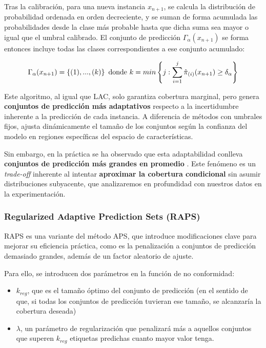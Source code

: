 Tras la calibración, para una nueva instancia $x_{n+1}$, se calcula la distribución de probabilidad ordenada
en orden decreciente, y se suman de forma acumulada las probabilidades desde la clase más probable hasta 
que dicha suma sea mayor o igual que el umbral calibrado. El conjunto de predicción $\Gamma_\alpha(x_{n+1})$
se forma entonces incluye todas las clases correspondientes a ese conjunto acumulado: 

$$
\Gamma_\alpha(x_{n+1}) = \left\{ (1),...,(k) \right\} \\ \textnormal{ donde } 
k = min\left\{ j: \sum_{i=1}^{j} \hat{\pi}_{(i)}(x_{n+1}) \ge \delta_\alpha \right\} 
$$

Este algoritmo, al igual que LAC, solo garantiza cobertura marginal, pero genera \textbf{conjuntos de 
predicción más adaptativos} respecto a la incertidumbre inherente a la predicción de cada instancia. 
A diferencia de métodos con umbrales fijos, ajusta dinámicamente el tamaño de los conjuntos según la 
confianza del modelo en regiones específicas del espacio de características.

Sin embargo, en la práctica se ha observado que esta adaptabilidad conlleva \textbf{conjuntos de predicción 
más grandes en promedio} \cite{romano2020, angelopoulos2020}. 
Este fenómeno es un \textit{trade-off} inherente al intentar \textbf{aproximar la cobertura condicional} sin 
asumir distribuciones subyacente, que analizaremos en profundidad con nuestros datos en la experimentación. 


\subsubsection{Regularized Adaptive Prediction Sets (RAPS)}

RAPS \cite{angelopoulos2020} es una variante del método APS, que introduce modificaciones clave para mejorar
su eficiencia práctica, como es la penalización a conjuntos de predicción demasiado grandes, además de un
factor aleatorio de ajuste. 

Para ello, se introducen dos parámetros en la función de no conformidad:

\begin{itemize}
    \item $k_{reg}$, que es el tamaño óptimo del conjunto de predicción (en el sentido de que, si todas los 
    conjuntos de predicción tuvieran ese tamaño, se alcanzaría la cobertura deseada)
    \item $\lambda$, un parámetro de regularización que penalizará más a aquellos conjuntos que superen 
    $k_{reg}$ etiquetas predichas cuanto mayor valor tenga.
\end{itemize}

